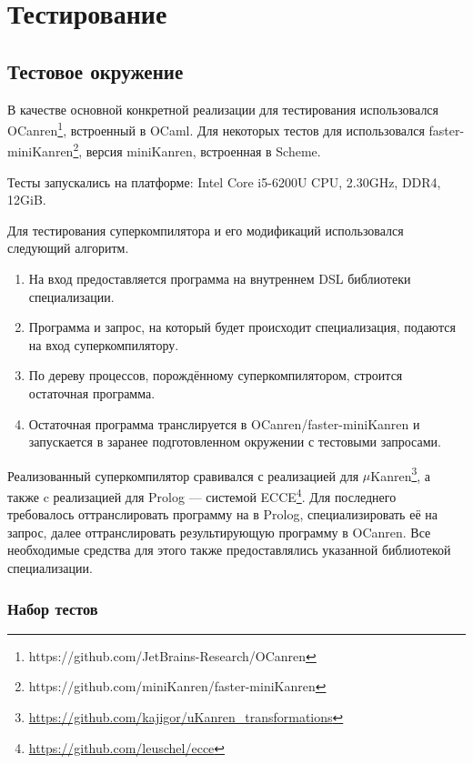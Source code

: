 \section{Тестирование}
\label{sec:testing}

\subsection{Тестовое окружение}

В качестве основной конкретной реализации \ukanren для тестирования
использовался OCanren\footnote{https://github.com/JetBrains-Research/OCanren}\cite{ocanren},
встроенный в OCaml\cite{ocanren}.
Для некоторых тестов для использовался faster-miniKanren\footnote{https://github.com/miniKanren/faster-miniKanren},
версия miniKanren, встроенная в Scheme.

Тесты запускались на платформе: Intel Core i5-6200U CPU, 2.30GHz, DDR4, 12GiB.

Для тестирования суперкомпилятора и его модификаций использовался следующий алгоритм.
\begin{enumerate}
\item На вход предоставляется программа на внутреннем DSL \ukanren библиотеки специализации.
\item Программа и запрос, на который будет происходит специализация, подаются на вход суперкомпилятору.
\item По дереву процессов, порождённому суперкомпилятором, строится остаточная программа.
\item Остаточная программа транслируется в OCanren/faster-miniKanren и
      запускается в заранее подготовленном окружении с тестовыми запросами.
\end{enumerate}


Реализованный суперкомпилятор сравивался с реализацией \forcpd для $\mu$Kanren\footnote{\url{https://github.com/kajigor/uKanren_transformations}},
а также c реализацией \forcpd для Prolog --- системой ECCE\footnote{\url{https://github.com/leuschel/ecce}}.
Для последнего требовалось оттранслировать программу на \ukanren в Prolog, специализировать
её на запрос, далее оттранслировать результирующую программу в OCanren. Все необходимые средства
для этого также предоставлялись указанной библиотекой специализации.

\subsubsection{Набор тестов}

